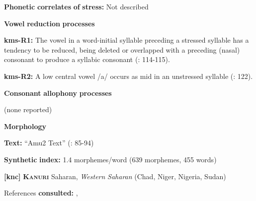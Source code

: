 \documentclass[output=paper]{langsci/langscibook}
\begin{document}
\begin{styleBody}
\textbf{Phonetic} \textbf{correlates} \textbf{of} \textbf{stress:} Not described
\end{styleBody}

\begin{styleBody}
\textbf{Vowel} \textbf{reduction} \textbf{processes}
\end{styleBody}

\begin{styleBody}
\textbf{kms-R1:} The vowel in a word-initial syllable preceding a stressed syllable has a tendency to be reduced, being deleted or overlapped with a preceding (nasal) consonant to produce a syllabic consonant (\citealt{SandersSanders1980}: 114-115).
\end{styleBody}

\begin{styleBody}
\textbf{kms-R2:} A low central vowel /a/ occurs as mid in an unstressed syllable (\citealt{SandersSanders1980}: 122).
\end{styleBody}

\begin{styleBody}
\textbf{Consonant} \textbf{allophony} \textbf{processes}
\end{styleBody}

\begin{styleBody}
(none reported)
\end{styleBody}

\begin{styleBody}
\textbf{Morphology}
\end{styleBody}

\begin{styleBody}
\textbf{Text:} “Amu2 Text” (\citealt{SandersSanders1994}: 85-94)
\end{styleBody}

\begin{styleBody}
\textbf{Synthetic} \textbf{index:} 1.4 morphemes/word (639 morphemes, 455 words)
\end{styleBody}

\begin{styleBody}
\textbf{[knc]}   \textbf{\textsc{Kanuri}}    Saharan, \textit{Western} \textit{Saharan} (Chad, Niger, Nigeria, Sudan)
\end{styleBody}

\begin{styleBody}
References \textbf{consulted:} \citet{Cyffer1998}, \citet{Hutchison1981}
\end{styleBody}
\end{document}
